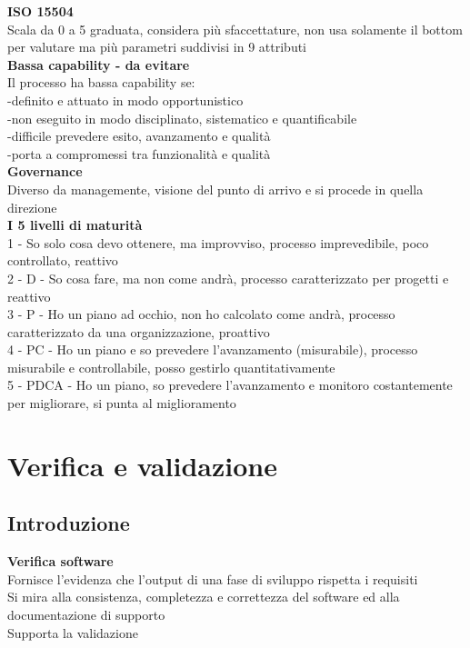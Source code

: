 \documentclass{article}
\begin{document}
		\textbf{ISO 15504}\\
		Scala da 0 a 5 graduata, considera più sfaccettature, non usa solamente il bottom per valutare ma più parametri suddivisi in 9 attributi\\
		
		\textbf{Bassa capability - da evitare}\\
		Il processo ha bassa capability se:\\
		-definito e attuato in modo opportunistico\\
		-non eseguito in modo disciplinato, sistematico e quantificabile\\
		-difficile prevedere esito, avanzamento e qualità\\
		-porta a compromessi tra funzionalità e qualità\\
		
		\textbf{Governance}\\
		Diverso da managemente, visione del punto di arrivo e si procede in quella direzione\\
		
		\textbf{I 5 livelli di maturità}\\
		1 - So solo cosa devo ottenere, ma improvviso, processo imprevedibile, poco controllato, reattivo\\
		2 - D - So cosa fare, ma non come andrà, processo caratterizzato per progetti e reattivo\\
		3 - P - Ho un piano ad occhio, non ho calcolato come andrà, processo caratterizzato da una organizzazione, proattivo\\
		4 - PC - Ho un piano e so prevedere l'avanzamento (misurabile), processo misurabile e controllabile, posso gestirlo quantitativamente\\
		5 - PDCA - Ho un piano, so prevedere l'avanzamento e monitoro costantemente per migliorare, si punta al miglioramento\\
		
		
		\clearpage
		\section{Verifica e validazione}
			\subsection{Introduzione}
			
				\textbf{Verifica software}\\
				Fornisce l'evidenza che l'output di una fase di sviluppo rispetta i requisiti\\
				Si mira alla consistenza, completezza e correttezza del software ed alla documentazione di supporto\\
				Supporta la validazione\\
				
\end{document}
